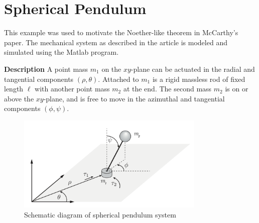 \documentclass[main.tex]{subfiles}
\begin{document}
\section{Spherical Pendulum}\label{sec:sphericalpendulum} 
This example was used to motivate the Noether-like theorem in McCarthy's paper. The mechanical system as described in the article is modeled and simulated using the Matlab program.

\textbf{Description} 
A point mass $m_1$ on the $xy$-plane can be actuated in the radial and tangential components $(\rho,\theta)$. Attached to $m_1$ is a rigid massless rod of fixed length $\ell$ with another point mass $m_2$ at the end. The second mass $m_2$ is on or above the $xy$-plane, and is free to move in the azimuthal and tangential components $(\phi,\psi)$.
\begin{figure}[h]
    \centering
    \includegraphics[width=0.8\textwidth]{assets/spherical-pen.png}
    \caption{Schematic diagram of spherical pendulum system \cite[5]{mccarthy}}
    \label{fig:sph-pen}
\end{figure}
\end{document}
